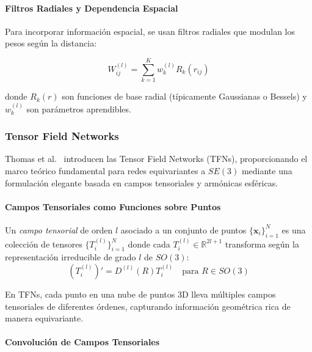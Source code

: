\paragraph{Filtros Radiales y Dependencia Espacial}

Para incorporar información espacial, se usan filtros radiales que modulan los pesos según la distancia:

\begin{equation}
W_{ij}^{(l)} = \sum_{k=1}^{K} w_k^{(l)} R_k(r_{ij})
\end{equation}

donde $R_k(r)$ son funciones de base radial (típicamente Gaussianas o Bessels) y $w_k^{(l)}$ son parámetros aprendibles.

\subsubsection{Tensor Field Networks}

Thomas et al.~\citep{thomas2018tensorfieldnetworks} introducen las Tensor Field Networks (TFNs), proporcionando el marco teórico fundamental para redes equivariantes a $SE(3)$ mediante una formulación elegante basada en campos tensoriales y armónicas esféricas.

\paragraph{Campos Tensoriales como Funciones sobre Puntos}

\begin{definition}\label{def:tensor_field}
Un \textit{campo tensorial} de orden $l$ asociado a un conjunto de puntos $\{\mathbf{x}_i\}_{i=1}^N$ es una colección de tensores $\{T_i^{(l)}\}_{i=1}^N$ donde cada $T_i^{(l)} \in \mathbb{R}^{2l+1}$ transforma según la representación irreducible de grado $l$ de $SO(3)$:
\begin{equation}
(T_i^{(l)})' = D^{(l)}(R) T_i^{(l)} \quad \text{para } R \in SO(3)
\end{equation}
\end{definition}

En TFNs, cada punto en una nube de puntos 3D lleva múltiples campos tensoriales de diferentes órdenes, capturando información geométrica rica de manera equivariante.

\paragraph{Convolución de Campos Tensoriales}

